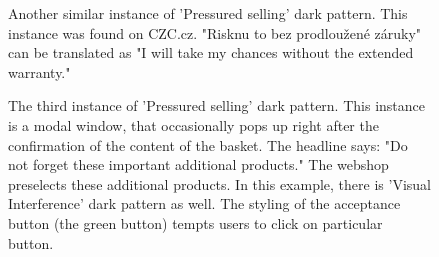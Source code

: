 \begin{figure}[ht]
\begin{minipage}[ht]{0.40\linewidth}
                \caption{Another similar instance of 'Pressured selling' dark pattern. This instance was found on CZC.cz. "Risknu to bez prodloužené záruky" can be translated as "I will take my chances without the extended warranty."}
                \label{fig:pressured-selling-czc}
            \end{minipage}
            \begin{minipage}[ht]{1\linewidth}
                \vspace{0.3cm}
                \centering
                \caption{The third instance of 'Pressured selling' dark pattern. This instance is a modal window, that occasionally pops up right after the confirmation of the content of the basket. The headline says: "Do not forget these important additional products." The webshop preselects these additional products. In this example, there is 'Visual Interference' dark pattern as well. The styling of the acceptance button (the green button) tempts users to click on particular button.}
                \label{fig:pressured-selling-alza2}
            \end{minipage}
        \end{figure}

